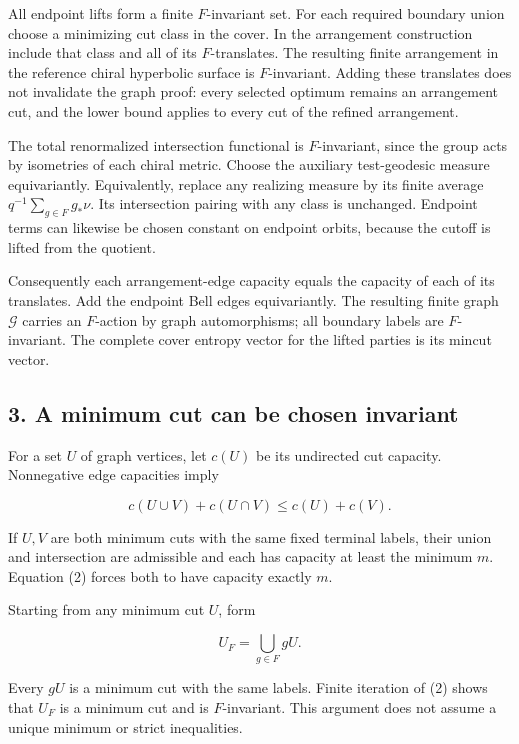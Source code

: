 \documentclass[11pt]{article}
\begin{document}
All endpoint lifts form a finite \(F\)-invariant set. For each required
boundary union choose a minimizing cut class in the cover. In the
arrangement construction include that class and all of its
\(F\)-translates. The resulting finite arrangement in the reference
chiral hyperbolic surface is \(F\)-invariant. Adding these translates
does not invalidate the graph proof: every selected optimum remains an
arrangement cut, and the lower bound applies to every cut of the refined
arrangement.

The total renormalized intersection functional is \(F\)-invariant, since
the group acts by isometries of each chiral metric. Choose the auxiliary
test-geodesic measure equivariantly. Equivalently, replace any realizing
measure by its finite average \(q^{-1}\sum_{g\in F}g_*\nu\). Its
intersection pairing with any class is unchanged. Endpoint terms can
likewise be chosen constant on endpoint orbits, because the cutoff is
lifted from the quotient.

Consequently each arrangement-edge capacity equals the capacity of each
of its translates. Add the endpoint Bell edges equivariantly. The
resulting finite graph \(\mathcal G\) carries an \(F\)-action by graph
automorphisms; all boundary labels are \(F\)-invariant. The complete
cover entropy vector for the lifted parties is its mincut vector.

\subsection{3. A minimum cut can be chosen
invariant}\label{a-minimum-cut-can-be-chosen-invariant}

For a set \(U\) of graph vertices, let \(c(U)\) be its undirected cut
capacity. Nonnegative edge capacities imply

\[
 c(U\cup V)+c(U\cap V)\le c(U)+c(V).
 \tag{2}
\]

If \(U,V\) are both minimum cuts with the same fixed terminal labels,
their union and intersection are admissible and each has capacity at
least the minimum \(m\). Equation (2) forces both to have capacity
exactly \(m\).

Starting from any minimum cut \(U\), form

\[
 U_F=\bigcup_{g\in F}gU.
 \tag{3}
\]

Every \(gU\) is a minimum cut with the same labels. Finite iteration of
(2) shows that \(U_F\) is a minimum cut and is \(F\)-invariant. This
argument does not assume a unique minimum or strict inequalities.
\end{document}
